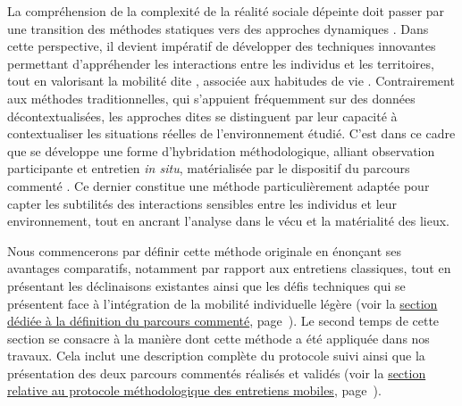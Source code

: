 \begin{refsegment}
La compréhension de la complexité de la réalité sociale dépeinte doit passer par une transition des méthodes statiques vers des approches dynamiques \textcolor{blue}{\textcite[207]{sheller_new_2006}}. Dans cette perspective, il devient impératif de développer des techniques innovantes permettant d’appréhender les interactions entre les individus et les territoires, tout en valorisant la mobilité dite , associée aux habitudes de vie \textcolor{blue}{\autocite[1~267-1~271]{hein_mobile_2008}}. Contrairement aux méthodes traditionnelles, qui s’appuient fréquemment sur des données décontextualisées, les approches dites  se distinguent par leur capacité à contextualiser les situations réelles de l’environnement étudié. C’est dans ce cadre que se développe une forme d’hybridation méthodologique, alliant observation participante et entretien \textsl{in situ}, matérialisée par le dispositif du parcours commenté \textcolor{blue}{\autocites[84]{thibaud_methode_2001}[3, 5]{despres_replacer_2019}{meissonnier_methodological_2020}}. Ce dernier constitue une méthode particulièrement adaptée pour capter les subtilités des interactions sensibles entre les individus et leur environnement, tout en ancrant l’analyse dans le vécu et la matérialité des lieux.%

Nous commencerons par définir cette méthode originale en énonçant ses avantages comparatifs, notamment par rapport aux entretiens classiques, tout en présentant les déclinaisons existantes ainsi que les défis techniques qui se présentent face à l'intégration de la mobilité individuelle légère (voir la \hyperref[chap3:parcours-commente-definition]{section dédiée à la définition du parcours commenté}, page~\pageref{chap3:parcours-commente-definition}). Le second temps de cette section se consacre à la manière dont cette méthode a été appliquée dans nos travaux. Cela inclut une description complète du protocole suivi ainsi que la présentation des deux parcours commentés réalisés et validés (voir la \hyperref[chap3:parcours-commente-administration]{section relative au protocole méthodologique des entretiens mobiles}, page~\pageref{chap3:parcours-commente-administration}).%


\end{refsegment}
